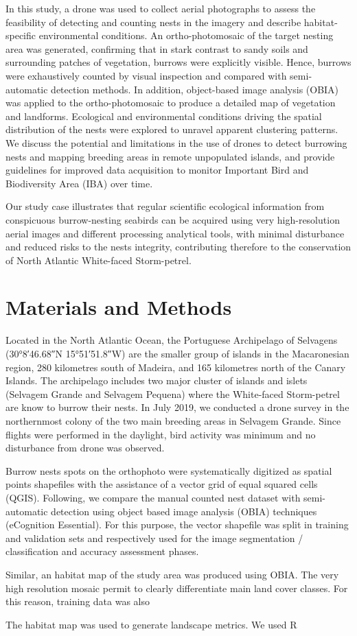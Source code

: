 \documentclass[12pt]{article}
\begin{document}
In this study, a drone was used to collect aerial photographs to assess the feasibility of detecting and counting nests in the imagery and describe habitat-specific environmental conditions. An ortho-photomosaic of the target nesting area was generated, confirming that in stark contrast to sandy soils and surrounding patches of vegetation, burrows were explicitly visible. Hence, burrows were exhaustively counted by visual inspection and compared with semi-automatic detection methods. In addition, object-based image analysis (OBIA) was applied to the ortho-photomosaic to produce a detailed map of vegetation and landforms. Ecological and environmental conditions driving the spatial distribution of the nests were explored to unravel apparent clustering patterns. We discuss the potential and limitations in the use of drones to detect burrowing nests and mapping breeding areas in remote unpopulated islands, and provide guidelines for improved data acquisition to monitor Important Bird and Biodiversity Area (IBA) over time. 

Our study case illustrates that regular scientific ecological information from conspicuous burrow-nesting seabirds can be acquired using very high-resolution aerial images and different processing analytical tools, with minimal disturbance and reduced risks to the nests integrity, contributing therefore to the conservation of North Atlantic White-faced Storm-petrel.

\section{Materials and Methods}

Located in the North Atlantic Ocean, the Portuguese Archipelago of Selvagens (\ang{30;8;46.68}N \ang{15;51;51.8}W) are the smaller group of islands in the Macaronesian region, 280 kilometres  south of Madeira, and 165 kilometres north of  the Canary Islands. The archipelago includes two major cluster of islands and islets (Selvagem Grande and Selvagem Pequena) where the White-faced Storm-petrel are know to burrow their nests. In July 2019, we conducted a drone survey in the northernmost colony of the two main breeding areas in Selvagem Grande.  Since flights were performed in the daylight, bird activity was minimum and no disturbance from drone was observed.

Burrow nests spots on the orthophoto were systematically digitized as spatial points shapefiles with the assistance of a  vector grid of equal squared cells (QGIS). Following, we compare the manual counted nest dataset with semi-automatic detection using object based image analysis (OBIA) techniques (eCognition Essential). For this purpose, the vector shapefile was split in training and validation sets and respectively used for the image segmentation / classification and accuracy assessment phases.

Similar, an habitat map of the study area was produced using OBIA. The very high resolution mosaic permit to clearly differentiate main land cover classes. For this reason, training data was also 

The habitat map was used to generate landscape metrics. We used R 


\end{document}
